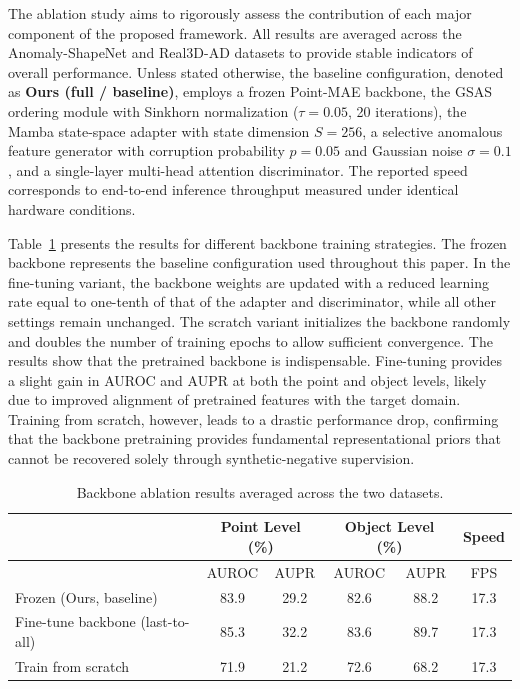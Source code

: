 The ablation study aims to rigorously assess the contribution of each major component of the proposed framework. All results are averaged across the Anomaly-ShapeNet and Real3D-AD datasets to provide stable indicators of overall performance. Unless stated otherwise, the baseline configuration, denoted as \textbf{Ours (full / baseline)}, employs a frozen Point-MAE backbone, the GSAS ordering module with Sinkhorn normalization (\(\tau=0.05\), 20 iterations), the Mamba state-space adapter with state dimension \(S=256\), a selective anomalous feature generator with corruption probability \(p=0.05\) and Gaussian noise \(\sigma=0.1\), and a single-layer multi-head attention discriminator. The reported speed corresponds to end-to-end inference throughput measured under identical hardware conditions.

Table~\ref{tab:backbone_ablation} presents the results for different backbone training strategies. The frozen backbone represents the baseline configuration used throughout this paper. In the fine-tuning variant, the backbone weights are updated with a reduced learning rate equal to one-tenth of that of the adapter and discriminator, while all other settings remain unchanged. The scratch variant initializes the backbone randomly and doubles the number of training epochs to allow sufficient convergence. The results show that the pretrained backbone is indispensable. Fine-tuning provides a slight gain in AUROC and AUPR at both the point and object levels, likely due to improved alignment of pretrained features with the target domain. Training from scratch, however, leads to a drastic performance drop, confirming that the backbone pretraining provides fundamental representational priors that cannot be recovered solely through synthetic-negative supervision.

\begin{table}[ht]
\centering
\caption{Backbone ablation results averaged across the two datasets.}
\label{tab:backbone_ablation}
\begin{tabular}{l|cc|cc|c}
\hline
& \multicolumn{2}{c|}{Point Level (\%)} & \multicolumn{2}{c|}{Object Level (\%)} & Speed \\
\hline
& AUROC & AUPR & AUROC & AUPR & FPS \\  
\hline
Frozen (Ours, baseline) & 83.9 & 29.2 & 82.6 & 88.2 & 17.3 \\
Fine-tune backbone (last-to-all) & 85.3 & 32.2 & 83.6 & 89.7 & 17.3 \\
Train from scratch & 71.9 & 21.2 & 72.6 & 68.2 & 17.3 \\
\hline
\end{tabular}
\end{table}

